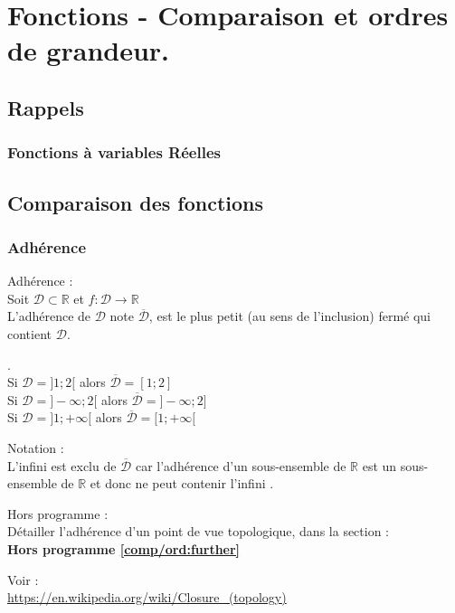 \chapter{Fonctions - Comparaison et ordres de grandeur.}\label{comp/ord}
\section{Rappels}\label{comp/ord:reminders}
\subsection{Fonctions à variables Réelles}

\section{Comparaison des fonctions}\label{comp/ord:comp}
\subsection{Adhérence}
\begin{definition}
    Adhérence :\\
    Soit \(\mathcal{D}\subset\mathbb{R}\) et \(f:\mathcal{D}\rightarrow\mathbb{R}\)\\
    L'adhérence de \(\mathcal{D}\) note \(\overline{\mathcal{D}}\), est le plus petit (au sens de l'inclusion) fermé qui contient \(\mathcal{D}\).
\end{definition}
\begin{example}
    .\\
    Si \(\mathcal{D} = ]1;2[\) alors \(\overline{\mathcal{D}} = [1;2]\)\\
    Si \(\mathcal{D} = ]-\infty;2[\) alors \(\overline{\mathcal{D}} = ]-\infty;2]\)\\
    Si \(\mathcal{D} = ]1;+\infty[\) alors \(\overline{\mathcal{D}} = [1;+\infty[\)
    \begin{Note}
        Notation :\\
        L'infini est exclu de \(\overline{\mathcal{D}}\) car l'adhérence d'un sous-ensemble de \(\mathbb{R}\) est un sous-ensemble de \(\mathbb{R}\) et donc ne peut contenir l'infini \autocite{TODO}.
    \end{Note}
\end{example}
\begin{Todo}
    Hors programme :\\
    Détailler l'adhérence d'un point de vue topologique, dans la section : \\\textbf{Hors programme \cref{comp/ord:further}}\par
    Voir : \\\url{https://en.wikipedia.org/wiki/Closure_(topology)}
\end{Todo}

